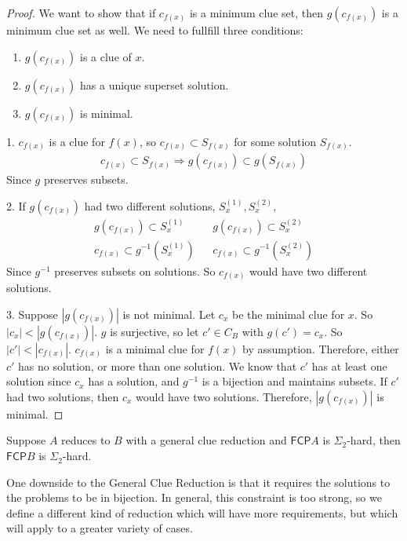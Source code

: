 \documentclass[runningheads,a4paper]{llncs}
\begin{document}
\begin{proof}
We want to show that if $c_{f(x)}$ is a minimum clue set, then $g(c_{f(x)})$ is a minimum clue set as well. We need to fullfill three conditions:
\begin{enumerate}
\item $g(c_{f(x)})$ is a clue of $x$. 
\item $g(c_{f(x)})$ has a unique superset solution.
\item $g(c_{f(x)})$ is minimal.
\end{enumerate}

1. $c_{f(x)}$ is a clue for $f(x)$, so $c_{f(x)} \subset S_{f(x)}$ for some solution $S_{f(x)}$. 
\begin{align} c_{f(x)} \subset S_{f(x)} \Rightarrow g(c_{f(x)}) \subset g(S_{f(x)}) \end{align}
Since $g$ preserves subsets.

2. If $g(c_{f(x)})$ had two different solutions, $S_x^{(1)}, S_x^{(2)}$, 
\begin{align}
g(c_{f(x)}) \subset S_x^{(1)}&& g(c_{f(x)}) \subset S_x^{(2)} \\
c_{f(x)} \subset g^{-1}(S_x^{(1)}) && c_{f(x)} \subset g^{-1}(S_x^{(2)})
\end{align}
Since $g^{-1}$ preserves subsets on solutions. So $c_{f(x)}$ would have two different solutions.

3. Suppose $|g(c_{f(x)})|$ is not minimal. Let $c_x$ be the minimal clue for $x$. So $|c_x| < |g(c_{f(x)})|$. $g$ is surjective, so let $c' \in C_B$ with $g(c') = c_x$. So $|c'| < |c_{f(x)}|$. $c_{f(x)}$ is a minimal clue for $f(x)$ by assumption. Therefore, either $c'$ has no solution, or more than one solution. We know that $c'$ has at least one solution since $c_x$ has a solution, and $g^{-1}$ is a bijection and maintains subsets. If $c'$ had two solutions, then $c_x$ would have two solutions. Therefore, $|g(c_{f(x)})|$ is minimal.
\end{proof}

\begin{corollary}
\label{thm:reduction}
Suppose $A$ reduces to $B$ with a general clue reduction and $\mathsf{FCP} A$ is $\Sigma_2$-hard, then $\mathsf{FCP} B$ is $\Sigma_2$-hard. 
\end{corollary}

One downside to the General Clue Reduction is that it requires the solutions to the problems to be in bijection. In general, this constraint is too strong, so we define a different kind of reduction which will have more requirements, but which will apply to a greater variety of cases.
\end{document}
